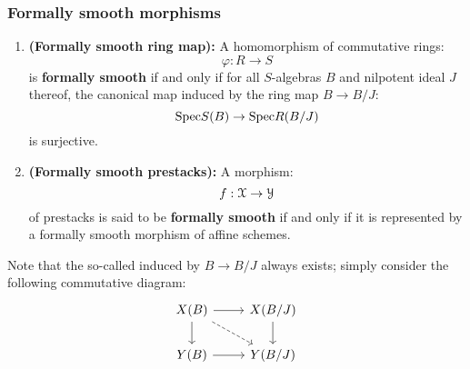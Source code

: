             \subsubsection{Formally smooth morphisms}
                \begin{definition} \label{def: formall_smoothness} 
                    \noindent
                    \begin{enumerate}
                        \item \textbf{(Formally smooth ring map):} A homomorphism of commutative rings:
                            $$\varphi: R \to S$$
                        is \textbf{formally smooth} if and only if for all $S$-algebras $B$ and nilpotent ideal $J$ thereof, the canonical map induced by the ring map $B \to B/J$:
                            $$\mathrm{Spec} S(B) \to \mathrm{Spec} R(B/J)$$
                        is surjective.
                        \item \textbf{(Formally smooth prestacks):} A morphism:
                            $$f: \mathcal{X} \to \mathcal{Y}$$
                        of prestacks is said to be \textbf{formally smooth} if and only if it is represented by a formally smooth morphism of affine schemes.
                    \end{enumerate}
                \end{definition}
                \begin{remark}
                    Note that the so-called  induced by $B \to B/J$ always exists; simply consider the following commutative diagram:
                        $$
                            \begin{tikzcd}
                            	{X(B)} & {X(B/J)} \\
                            	{Y(B)} & {Y(B/J)}
                            	\arrow[from=1-1, to=2-1]
                            	\arrow[from=2-1, to=2-2]
                            	\arrow[from=1-1, to=1-2]
                            	\arrow[from=1-2, to=2-2]
                            	\arrow[dashed, from=1-1, to=2-2]
                            \end{tikzcd}
                        $$
                \end{remark}
                
